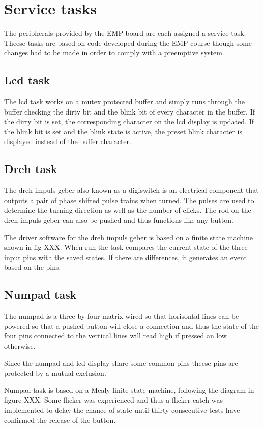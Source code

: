 \section{Service tasks}
The peripherals provided by the EMP board are each assigned a service task. Theese tasks are based on code developed during the EMP course though some changes had to be made in order to comply with a preemptive system. 

\subsection{Lcd task}
The lcd task works on a mutex protected buffer and simply runs through the buffer checking the dirty bit and the blink bit of every character in the buffer. If the dirty bit is set, the corresponding character on the lcd display is updated. If the blink bit is set and the blink state is active, the preset blink character is displayed instead of the buffer character.

\subsection{Dreh task}
The dreh impuls geber also known as a digiswitch is an electrical component that outputs a pair of phase shifted pulse trains when turned. The pulses are used to determine the turning direction as well as the number of clicks. The rod on the dreh impuls geber can also be pushed and thus functions like any button.

The driver software for the dreh impuls geber is based on a finite state machine shown in fig XXX. When run the task compares the current state of the three input pins with the saved states. If there are differences, it generates an event based on the pins.

\subsection{Numpad task}
The numpad is a three by four matrix wired so that horisontal lines can be powered so that a pushed button will close a connection and thus the state of the four pins connected to the vertical lines will read high if pressed an low otherwise.

Since the numpad and lcd display share some common pins theese pins are protected by a mutual exclusion.

Numpad task is based on a Mealy finite state machine, following the diagram in figure XXX.  Some flicker was experienced and thus a flicker catch was implemented to delay the chance of state until thirty consecutive tests have confirmed the release of the button.


